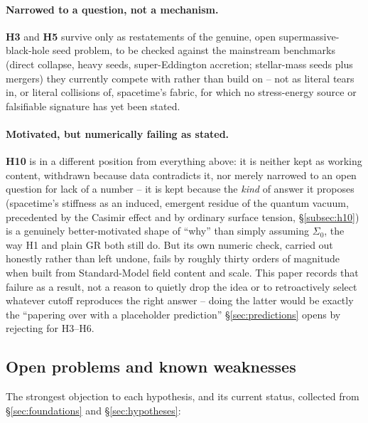\documentclass[12pt, a4paper]{article}
\begin{document}
\paragraph{Narrowed to a question, not a mechanism.}
\textbf{H3} and \textbf{H5} survive only as restatements of the
genuine, open supermassive-black-hole seed problem, to be checked
against the mainstream benchmarks (direct collapse, heavy seeds,
super-Eddington accretion; stellar-mass seeds plus mergers) they
currently compete with rather than build on -- not as literal tears
in, or literal collisions of, spacetime's fabric, for which no
stress-energy source or falsifiable signature has yet been stated.

\paragraph{Motivated, but numerically failing as stated.}
\textbf{H10} is in a different position from everything above: it is
neither kept as working content, withdrawn because data contradicts
it, nor merely narrowed to an open question for lack of a number --
it is kept because the \emph{kind} of answer it proposes (spacetime's
stiffness as an induced, emergent residue of the quantum vacuum,
precedented by the Casimir effect and by ordinary surface tension,
\S\ref{subsec:h10}) is a genuinely better-motivated shape of ``why''
than simply assuming $\Sigma_0$, the way H1 and plain GR both still
do. But its own numeric check, carried out honestly rather than left
undone, fails by roughly thirty orders of magnitude when built from
Standard-Model field content and scale. This paper records that
failure as a result, not a reason to quietly drop the idea or to
retroactively select whatever cutoff reproduces the right answer --
doing the latter would be exactly the ``papering over with a
placeholder prediction'' \S\ref{sec:predictions} opens by rejecting
for H3--H6.

\subsection{Open problems and known weaknesses}
The strongest objection to each hypothesis, and its current status,
collected from \S\ref{sec:foundations} and \S\ref{sec:hypotheses}:
\end{document}
